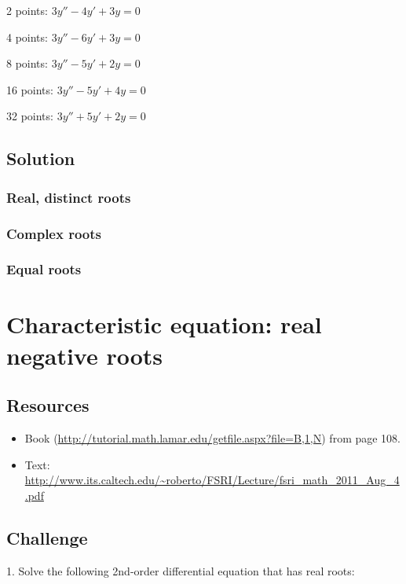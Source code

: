 2 points: $\displaystyle 3 y'' - 4 y' + 3 y = 0$ %

4 points: $\displaystyle 3 y'' - 6 y' + 3 y = 0$ %

8 points: $\displaystyle 3 y'' - 5 y' + 2 y = 0$ %

16 points: $\displaystyle 3 y'' - 5 y' + 4 y = 0$ %

32 points: $\displaystyle 3 y'' + 5 y' + 2 y = 0$ %

\subsection*{Solution}

\subsubsection*{Real, distinct roots}

\subsubsection*{Complex roots}

\subsubsection{Equal roots}




\newpage
\section{Characteristic equation: real negative roots}

\subsection*{Resources}
\begin{itemize}
    \item Book (\url{http://tutorial.math.lamar.edu/getfile.aspx?file=B,1,N}) from page 108.
    \item Text: \url{http://www.its.caltech.edu/~roberto/FSRI/Lecture/fsri_math_2011_Aug_4.pdf}
\end{itemize}

\subsection*{Challenge}
1. Solve the following 2nd-order differential equation that has real roots:

